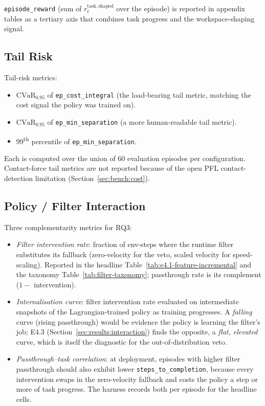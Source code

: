 \documentclass[11pt,a4paper]{report}
\newcommand{\pfl}{PFL}
\newcommand{\cvar}{\ensuremath{\mathrm{CVaR}}}
\begin{document}
\texttt{episode\_reward} (sum of $r^{\mathrm{task,shaped}}_t$ over
the episode) is reported in appendix tables as a tertiary axis
that combines task progress and the workspace-shaping signal.

\subsection{Tail Risk}
\label{sec:setup:metrics:tail}

Tail-risk metrics:
\begin{itemize}[topsep=2pt,itemsep=1pt]
\item $\cvar_{0.95}$ of \texttt{ep\_cost\_integral} (the
  load-bearing tail metric, matching the cost signal the policy
  was trained on).
\item $\cvar_{0.95}$ of \texttt{ep\_min\_separation} (a more
  human-readable tail metric).
\item 99\textsuperscript{th} percentile of
  \texttt{ep\_min\_separation}.
\end{itemize}
Each is computed over the union of 60 evaluation episodes per
configuration. Contact-force tail metrics are not reported because
of the open \pfl{} contact-detection limitation
(Section~\ref{sec:bench:cost}).

\subsection{Policy / Filter Interaction}
\label{sec:setup:metrics:interaction}

Three complementarity metrics for RQ3:
\begin{itemize}[topsep=2pt,itemsep=1pt]
\item \emph{Filter intervention rate}: fraction of env-steps where
  the runtime filter substitutes its fallback (zero-velocity for the
  veto, scaled velocity for speed-scaling). Reported in the headline
  Table~\ref{tab:e4.1-feature-incremental} and the taxonomy
  Table~\ref{tab:filter-taxonomy}; passthrough rate is its complement
  ($1 -$ intervention).
\item \emph{Internalisation curve}: filter intervention rate
  evaluated on intermediate snapshots of the Lagrangian-trained
  policy as training progresses. A \emph{falling} curve (rising
  passthrough) would be evidence the policy is learning the filter's
  job; E4.3 (Section~\ref{sec:results:interaction}) finds the opposite,
  a \emph{flat, elevated} curve, which is itself the diagnostic for the
  out-of-distribution veto.
\item \emph{Passthrough--task correlation}: at deployment, episodes
  with higher filter passthrough should also exhibit lower
  \texttt{steps\_to\_completion}, because every intervention swaps
  in the zero-velocity fallback and costs the policy a step or
  more of task progress. The harness records both per episode for
  the headline cells.
\end{itemize}
\end{document}
